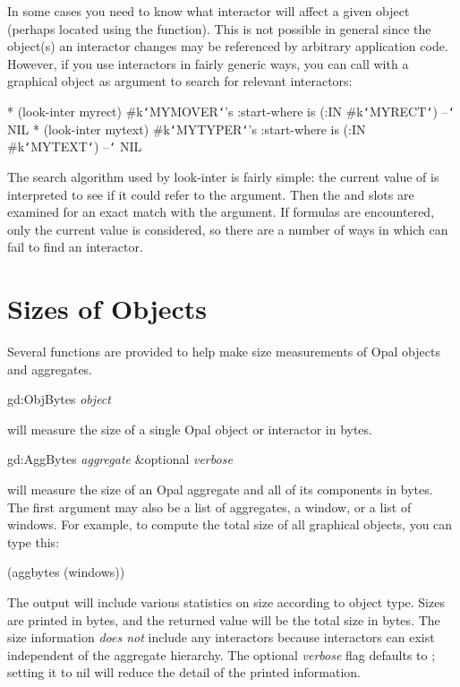 In some cases you need to know what interactor will affect a given
object (perhaps located using the  function).  This is
not possible in general since the object(s) an interactor
changes may be referenced by arbitrary application code.  However,
if you use interactors in fairly generic ways, you can call
 with a graphical object as argument to search
for relevant interactors:
\begin{programexample}
* (look-inter myrect)
\#k{\tt\char`\<}MYMOVER{\tt\char`\>}'s :start-where is (:IN \#k{\tt\char`\<}MYRECT{\tt\char`\>})
--{\tt\char`\>} NIL
* (look-inter mytext)
\#k{\tt\char`\<}MYTYPER{\tt\char`\>}'s :start-where is (:IN \#k{\tt\char`\<}MYTEXT{\tt\char`\>})
--{\tt\char`\>} NIL
\end{programexample}

The search algorithm used by look-inter is fairly simple:
the current value of  is interpreted to see
if it could refer to the argument.  Then the 
and  slots are examined for an exact match
with the argument.  If formulas are encountered, only the current
value is considered, so there are a number of ways in which
 can fail to find an interactor.

\chapter{Sizes of Objects}
Several functions are provided to help make size measurements of
Opal objects and aggregates.
\begin{programexample}
gd:ObjBytes {\it object}\value{function}
\end{programexample}
will measure the size of a single Opal object or interactor in bytes.

\begin{programexample}
gd:AggBytes {\it aggregate} \&optional {\it verbose}\value{function}
\end{programexample}
will measure the size of an Opal aggregate and all of its
components in bytes.  The first
argument may also be a list of aggregates, a window, or a list
of windows.  For example, to compute the total size of all graphical
objects, you can type this:
\begin{programexample}
(aggbytes (windows))
\end{programexample}
The output will include various statistics on size according
to object type.  Sizes are printed in bytes, and
the returned value will be the total size in
bytes.  The size information {\it does not} include any interactors
because interactors can exist independent of the
aggregate hierarchy.
The optional {\it verbose} flag defaults to ; setting
it to nil will reduce the detail of the printed information.


